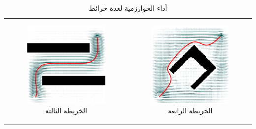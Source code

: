 \begin{center}
\begin{table}[ht]
\begin{tabular}{cc}
		\newline
		\begin{subfigure}{0.4\textwidth}\centering\includegraphics[width=0.9\linewidth]{figs/11/fig3}\caption{الخريطة الثالثة}\label{11:fig:3}\end{subfigure}&
		\begin{subfigure}{0.4\textwidth}\centering\includegraphics[width=0.9\linewidth]{figs/11/fig4}\caption{الخريطة الرابعة}\label{11:fig:4}\end{subfigure}\\
	\end{tabular}
	\caption{أداء الخوارزمية لعدة خرائط}
	\label{tab:mytable}
\end{table}
\end{center}

